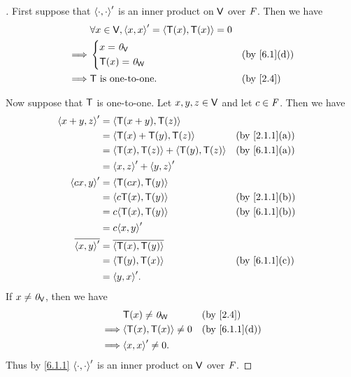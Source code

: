 \begin{proof}[]
  First suppose that \(\left\langle\cdot, \cdot\right\rangle'\) is an inner product on \(\mathsf{V}\) over \(\mathit{F}\).
  Then we have
  \begin{align*}
             & \forall x \in \V, \inn{x, x}' = \inn{\T(x), \T(x)} = 0                             \\
    \implies & \begin{dcases}
                 x = \zv_{\V} \\
                 \T(x) = \zv_{\W}
               \end{dcases}                                       &  & \text{(by \cref{6.1}(d))}  \\
    \implies & \T \text{ is one-to-one}.                              &  & \text{(by \cref{2.4})}
  \end{align*}

  Now suppose that \(\mathsf{T}\) is one-to-one.
  Let \(x, y, z \in \mathsf{V}\) and let \(c \in \mathit{F}\).
  Then we have
  \begin{align*}
    \inn{x + y, z}'    & = \inn{\T(x + y), \T(z)}                                                   \\
                       & = \inn{\T(x) + \T(y), \T(z)}              &  & \text{(by \cref{2.1.1}(a))} \\
                       & = \inn{\T(x), \T(z)} + \inn{\T(y), \T(z)} &  & \text{(by \cref{6.1.1}(a))} \\
                       & = \inn{x, z}' + \inn{y, z}'                                                \\
    \inn{cx, y}'       & = \inn{\T(cx), \T(y)}                                                      \\
                       & = \inn{c \T(x), \T(y)}                    &  & \text{(by \cref{2.1.1}(b))} \\
                       & = c \inn{\T(x), \T(y)}                    &  & \text{(by \cref{6.1.1}(b))} \\
                       & = c \inn{x, y}'                                                            \\
    \conj{\inn{x, y}'} & = \conj{\inn{\T(x), \T(y)}}                                                \\
                       & = \inn{\T(y), \T(x)}                      &  & \text{(by \cref{6.1.1}(c))} \\
                       & = \inn{y, x}'.
  \end{align*}
  If \(x \neq \mathit{0}_{\mathsf{V}}\), then we have
  \begin{align*}
             & \T(x) \neq \zv_{\W}       &  & \text{(by \cref{2.4})}      \\
    \implies & \inn{\T(x), \T(x)} \neq 0 &  & \text{(by \cref{6.1.1}(d))} \\
    \implies & \inn{x, x}' \neq 0.
  \end{align*}
  Thus by \cref{6.1.1} \(\left\langle\cdot, \cdot\right\rangle'\) is an inner product on \(\mathsf{V}\) over \(\mathit{F}\).
\end{proof}

